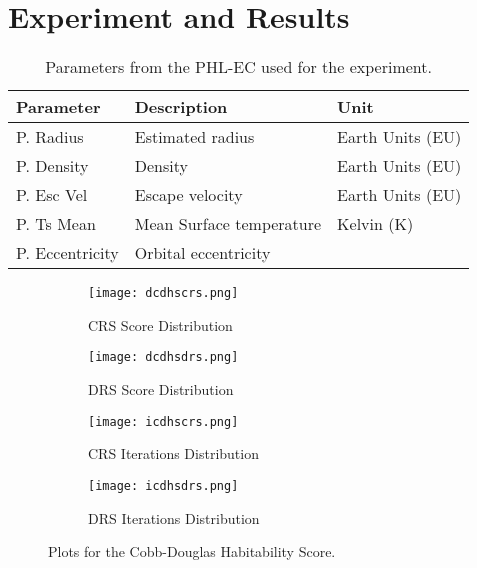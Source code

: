 \documentclass[10pt,draft]{article}
\begin{document}
\section{Experiment and Results}\label{sec:results}

\begin{table}
  \begin{center}
    \begin{tabular}{l l l}
      \toprule
      \textbf{Parameter} & \textbf{Description} & \textbf{Unit}\\
      \midrule
      P. Radius       & Estimated radius         & Earth Units (EU)\\
      P. Density      & Density                  & Earth Units (EU)\\
      P. Esc Vel      & Escape velocity          & Earth Units (EU)\\
      P. Ts Mean      & Mean Surface temperature & Kelvin (K)\\
      P. Eccentricity & Orbital eccentricity\\
      \bottomrule
    \end{tabular}
  \end{center}
  \caption{Parameters from the PHL-EC used for the experiment.}\label{tab:param}
\end{table}


\begin{figure}
  \centering
  \begin{subfigure}[b]{0.38\textwidth}
    \texttt{[image: dcdhscrs.png]}
    \caption{CRS Score Distribution}\label{fig:distcdcrs}
  \end{subfigure}
  \quad
  \begin{subfigure}[b]{0.38\textwidth}
    \texttt{[image: dcdhsdrs.png]}
    \caption{DRS Score Distribution}\label{fig:distcddrs}
  \end{subfigure}

  \begin{subfigure}[b]{0.38\textwidth}
    \texttt{[image: icdhscrs.png]}
    \caption{CRS Iterations Distribution}\label{fig:itercdcrs}
  \end{subfigure}
  \quad
  \begin{subfigure}[b]{0.38\textwidth}
    \texttt{[image: icdhsdrs.png]}
    \caption{DRS Iterations Distribution}\label{fig:itercddrs}
  \end{subfigure}
  \caption{Plots for the Cobb-Douglas Habitability Score.}\label{fig:cdhs}
\end{figure}
\end{document}

